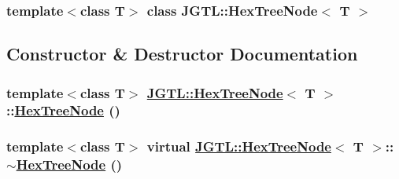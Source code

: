 \subsubsection*{template$<$class T$>$ class JGTL::Hex\-Tree\-Node$<$ T $>$}



\subsection{Constructor \& Destructor Documentation}
\hypertarget{class_j_g_t_l_1_1_hex_tree_node_564ae11ac8eac7662e7fac5fc8c49f57}{
\subsubsection[HexTreeNode]{\setlength{\rightskip}{0pt plus 5cm}template$<$class T$>$ \hyperlink{class_j_g_t_l_1_1_hex_tree_node}{JGTL::Hex\-Tree\-Node}$<$ T $>$::\hyperlink{class_j_g_t_l_1_1_hex_tree_node}{Hex\-Tree\-Node} ()}}
\label{class_j_g_t_l_1_1_hex_tree_node_564ae11ac8eac7662e7fac5fc8c49f57}


\hypertarget{class_j_g_t_l_1_1_hex_tree_node_274897364d0457a85e4efcc0ea9de0c4}{
\subsubsection[$\sim$HexTreeNode]{\setlength{\rightskip}{0pt plus 5cm}template$<$class T$>$ virtual \hyperlink{class_j_g_t_l_1_1_hex_tree_node}{JGTL::Hex\-Tree\-Node}$<$ T $>$::$\sim$\hyperlink{class_j_g_t_l_1_1_hex_tree_node}{Hex\-Tree\-Node} ()}}
\label{class_j_g_t_l_1_1_hex_tree_node_274897364d0457a85e4efcc0ea9de0c4}




